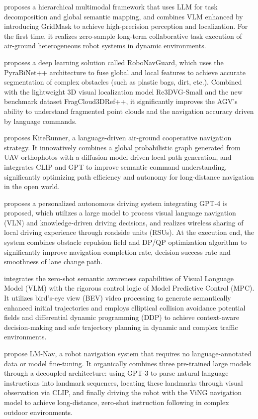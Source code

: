 \documentclass[11pt,a4paper]{article}
\begin{document}
\cite{zafar2025swarmvlm} proposes a hierarchical multimodal framework that uses LLM for task decomposition and global semantic mapping, and combines VLM enhanced by introducing GridMask to achieve high-precision perception and localization. For the first time, it realizes zero-sample long-term collaborative task execution of air-ground heterogeneous robot systems in dynamic environments.

\cite{tan2025robonavguard} proposes a deep learning solution called RoboNavGuard, which uses the PyraBiNet++ architecture to fuse global and local features to achieve accurate segmentation of complex obstacles (such as plastic bags, dirt, etc.). Combined with the lightweight 3D visual localization model Re3DVG-Small and the new benchmark dataset FragCloud3DRef++, it significantly improves the AGV's ability to understand fragmented point clouds and the navigation accuracy driven by language commands.
 
\cite{huang2025kiterunner} proposes KiteRunner, a language-driven air-ground cooperative navigation strategy. It innovatively combines a global probabilistic graph generated from UAV orthophotos with a diffusion model-driven local path generation, and integrates CLIP and GPT to improve semantic command understanding, significantly optimizing path efficiency and autonomy for long-distance navigation in the open world.

\cite{hu2025integrating} proposes a personalized autonomous driving system integrating GPT-4 is proposed, which utilizes a large model to process visual language navigation (VLN) and knowledge-driven driving decisions, and realizes wireless sharing of local driving experience through roadside units (RSUs). At the execution end, the system combines obstacle repulsion field and DP/QP optimization algorithm to significantly improve navigation completion rate, decision success rate and smoothness of lane change path.


\cite{wang2025visiopath} integrates the zero-shot semantic awareness capabilities of Visual Language Model (VLM) with the rigorous control logic of Model Predictive Control (MPC). It utilizes bird's-eye view (BEV) video processing to generate semantically enhanced initial trajectories and employs elliptical collision avoidance potential fields and differential dynamic programming (DDP) to achieve context-aware decision-making and safe trajectory planning in dynamic and complex traffic environments.

\cite{shah2023lm} propose LM-Nav, a robot navigation system that requires no language-annotated data or model fine-tuning. It organically combines three pre-trained large models through a decoupled architecture: using GPT-3 to parse natural language instructions into landmark sequences, locating these landmarks through visual observation via CLIP, and finally driving the robot with the ViNG navigation model to achieve long-distance, zero-shot instruction following in complex outdoor environments.
\end{document}
